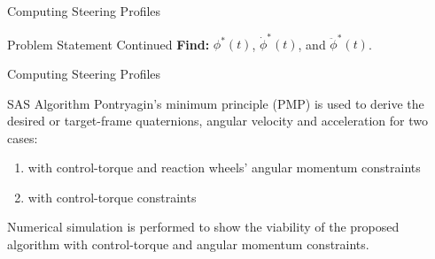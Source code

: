 \documentclass{beamer}
\begin{document}
\begin{frame}{Computing Steering Profiles}
\begin{block}{ Problem Statement Continued}
{\bf Find:} $\phi^*(t)$, $\dot{\phi}^*(t)$, and $\ddot{\phi}^*(t)$.
\end{block}
\end{frame}
\begin{frame}{Computing Steering Profiles}
\begin{block}{SAS Algorithm}	
	Pontryagin's minimum principle (PMP) is used to derive the desired or target-frame quaternions, angular velocity and acceleration for two cases: 
	\begin{enumerate}
		\item with control-torque and reaction wheels' angular momentum constraints
		\item with control-torque constraints
	\end{enumerate} 
	Numerical simulation is performed to show the viability of the proposed algorithm with control-torque and angular momentum constraints.
\end{block}
\end{frame}
\end{document}
